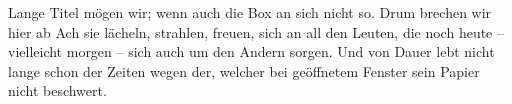 \documentclass[twocolumn]{article}
\begin{document}
    \blindtext

    \begin{definition*}{Lange Titel mögen wir; wenn auch die Box an sich nicht so. Drum brechen wir hier ab}
        \label{def:exdef}Ach sie lächeln, strahlen, freuen, sich an all den Leuten,
        die noch heute -- vielleicht morgen -- sich auch um den Andern sorgen. Und von Dauer lebt nicht lange schon der Zeiten wegen
        der, welcher bei geöffnetem Fenster sein Papier nicht beschwert.
    \end{definition*}

    \blindtext

    \listofdefinitions
    \listofremarks
    \listoftheorems
    \listofexamples
\end{document}
